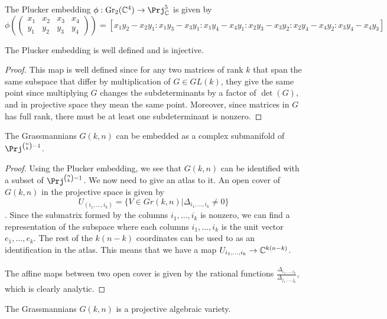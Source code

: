 \documentclass[a4paper]{article}
\begin{document}
\begin{eg}{}{} The Plucker embedding $\phi:\text{Gr}_2(\C^4)\to\Prj_\C^5$ is given by $$\phi\left(\begin{pmatrix}
x_1 & x_2 & x_3 & x_4\\
y_1 & y_2 & y_3 & y_4
\end{pmatrix}\right)=[x_1y_2-x_2y_1:x_1y_3-x_3y_1:x_1y_4-x_4y_1:x_2y_3-x_3y_2:x_2y_4-x_4y_2:x_3y_4-x_4y_3]$$
\end{eg}

\begin{prp}{}{} The Plucker embedding is well defined and is injective. 
\begin{proof}
This map is well defined since for any two matrices of rank $k$ that span the same subspace that differ by multiplication of $G\in GL(k)$, they give the same point since multiplying $G$ changes the subdeterminants by a factor of $\det(G)$, and in projective space they mean the same point. Moreover, since matrices in $G$ has full rank, there must be at least one subdeterminant is nonzero. 
\end{proof}
\end{prp}

\begin{thm}{}{} The Grassmannians $G(k,n)$ can be embedded as a complex submanifold of $\Prj^{\binom{n}{k}-1}$. 
\begin{proof}
Using the Plucker embedding, we see that $G(k,n)$ can be identified with a subset of $\Prj^{\binom{n}{k}-1}$. We now need to give an atlas to it. An open cover of $G(k,n)$ in the projective space is given by $$U_{(i_1,\dots,i_k)}=\{V\in Gr(k,n)|\Delta_{i_1,\dots,i_k}\neq 0\}$$. Since the submatrix formed by the columns $i_1,\dots,i_k$ is nonzero, we can find a representation of the subspace where each columns $i_1,\dots,i_k$ is the unit vector $e_1,\dots,e_k$. The rest of the $k(n-k)$ coordinates can be used to as an identification in the atlas. This means that we have a map $U_{i_1,\dots,i_k}\to\mathbb{C}^{k(n-k)}$. \\~\\
The affine maps between two open cover is given by the rational functions $\frac{\Delta_{i_1,\dots,i_k}}{\Delta_{j_1,\dots,j_k}}$, which is clearly analytic. 
\end{proof}
\end{thm}

\begin{thm}{}{} The Grassmannians $G(k,n)$ is a projective algebraic variety. 
\end{thm}
\end{document}
